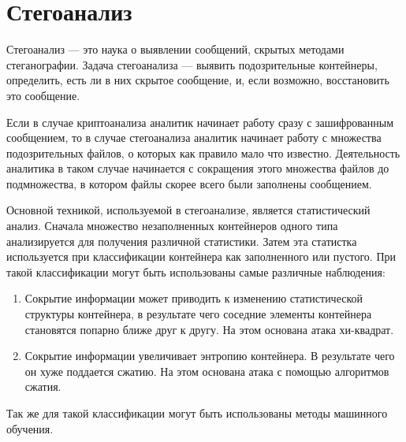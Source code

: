 \section{Стегоанализ}
Стегоанализ --- это наука о выявлении сообщений, скрытых методами стеганографии.
Задача стегоанализа --- выявить подозрительные контейнеры, определить, есть ли в них скрытое сообщение,
и, если возможно, восстановить это сообщение.

Если в случае криптоанализа аналитик начинает работу сразу с зашифрованным сообщением,
то в случае стегоанализа аналитик начинает работу с множества подозрительных файлов,
о которых как правило мало что известно. Деятельность аналитика в таком случае
начинается с сокращения этого множества файлов до подмножества, в котором файлы
скорее всего были заполнены сообщением.

Основной техникой, используемой в стегоанализе, является статистический анализ.
Сначала множество незаполненных контейнеров одного типа анализируется для получения
различной статистики. Затем эта статистка используется при классификации контейнера
как заполненного или пустого. При такой классификации могут быть использованы
самые различные наблюдения:
\begin{enumerate}
    \item Сокрытие информации может приводить к изменению статистической структуры
    контейнера, в результате чего соседние элементы контейнера становятся попарно ближе
    друг к другу. На этом основана атака хи-квадрат.
    \item Сокрытие информации увеличивает энтропию контейнера. В результате чего он
    хуже поддается сжатию. На этом основана атака с помощью алгоритмов сжатия.
\end{enumerate}
Так же для такой классификации могут быть использованы методы машинного обучения.